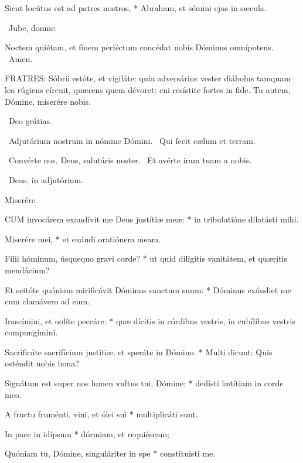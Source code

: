 Sicut locútus est ad patres nostros, * Abraham, et sémini ejus in sæcula.



\V\ Jube, domne.

 Noctem quiétam, et finem perféctum concédat nobis Dóminus omnípotens. \R\ Amen.


\lettrine[lines=2]{F}{RATRES}: Sóbrii estóte, et vigiláte: quia adversárius vester diábolus tamquam leo rúgiens círcuit, quærens quem dévoret: cui resístite fortes in fide. Tu autem, Dómine, miserére nobis.

\R\ Deo grátias.

\V\ Adjutórium nostrum in nómine Dómini. \R\ Qui fecit cælum et terram.



\V\ Convérte nos, Deus, salutáris noster. \R\ Et avérte iram tuam a nobis.

\V\ Deus, in adjutórium.

 Miserére.


\lettrine[lines=2]{C}{UM} invocárem exaudívit me Deus justítiæ meæ: * in tribulatióne dilatásti mihi.

Miserére mei, * et exáudi oratiónem meam.

Fílii hóminum, úsquequo gravi corde? * ut quid dilígitis vanitátem, et quæritis mendácium?

Et scitóte quóniam mirificávit Dóminus sanctum suum: * Dóminus exáudiet me cum clamávero ad eum.

Irascímini, et nolíte peccáre: * quæ dícitis in córdibus vestris, in cubílibus vestris compungímini.

Sacrificáte sacrifícium justítiæ, et speráte in Dómino. * Multi dicunt: Quis osténdit nobis bona?

Signátum est super nos lumen vultus tui, Dómine: * dedísti lætítiam in corde meo.

A fructu fruménti, vini, et ólei sui * multiplicáti sunt.

In pace in idípsum * dórmiam, et requiéscam;

Quóniam tu, Dómine, singuláriter in spe * constituísti me.

